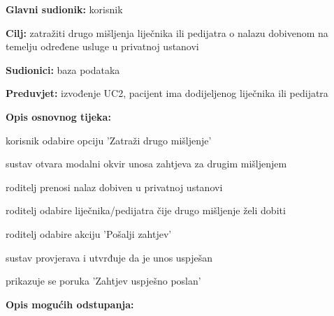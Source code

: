                     \noindent {}
					\begin{packed_item}
						\item \textbf{Glavni sudionik: }korisnik
						\item  \textbf{Cilj:} zatražiti drugo mišljenja liječnika ili pedijatra o nalazu dobivenom na temelju određene usluge u privatnoj ustanovi
						\item  \textbf{Sudionici:} baza podataka
						\item  \textbf{Preduvjet:} izvođenje UC2, pacijent ima dodijeljenog liječnika ili pedijatra
						\item  \textbf{Opis osnovnog tijeka:}
						
						\item[] \begin{packed_enum}
							\item korisnik odabire opciju 'Zatraži drugo mišljenje'
							\item sustav otvara modalni okvir unosa zahtjeva za drugim mišljenjem
							\item roditelj prenosi nalaz dobiven u privatnoj ustanovi
                            \item roditelj odabire liječnika/pedijatra čije drugo mišljenje želi dobiti
							\item roditelj odabire akciju 'Pošalji zahtjev'
							\item sustav provjerava i utvrđuje da je unos uspješan
							\item prikazuje se poruka 'Zahtjev uspješno poslan'
						
						\end{packed_enum}
						
						\item  \textbf{Opis mogućih odstupanja:}
						

\end{packed_item}

